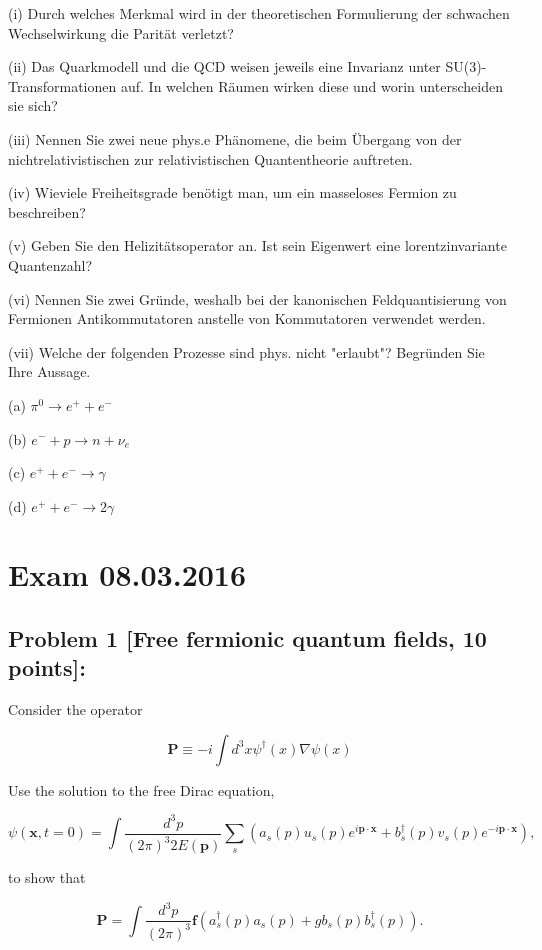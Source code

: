 \documentclass[10pt, letterpaper]{article}
\begin{document}
(i) Durch welches Merkmal wird in der theoretischen Formulierung der schwachen Wechselwirkung die Parität verletzt?

(ii) Das Quarkmodell und die QCD weisen jeweils eine Invarianz unter SU(3)-Transformationen auf. In welchen Räumen wirken diese und worin unterscheiden sie sich?

(iii) Nennen Sie zwei neue phys.e Phänomene, die beim Übergang von der nichtrelativistischen zur relativistischen Quantentheorie auftreten.

(iv) Wieviele Freiheitsgrade benötigt man, um ein masseloses Fermion zu beschreiben?

(v) Geben Sie den Helizitätsoperator an. Ist sein Eigenwert eine lorentzinvariante Quantenzahl?

(vi) Nennen Sie zwei Gründe, weshalb bei der kanonischen Feldquantisierung von Fermionen Antikommutatoren anstelle von Kommutatoren verwendet werden.

(vii) Welche der folgenden Prozesse sind phys. nicht "erlaubt"? Begründen Sie Ihre Aussage.

(a) $\pi^0 \rightarrow e^{+}+e^{-}$

(b) $e^{-}+p \rightarrow n+\nu_e$

(c) $e^{+}+e^{-} \rightarrow \gamma$

(d) $e^{+}+e^{-} \rightarrow 2 \gamma$

\pagebreak

\section{Exam 08.03.2016}

\subsection{Problem 1 [Free fermionic quantum fields, 10 points]:}
Consider the operator

$$
\mathbf{P} \equiv-i \int d^3 x \psi^{\dagger}(x) \nabla \psi(x)
$$


Use the solution to the free Dirac equation,

$$
\psi(\mathbf{x}, t=0)=\int \frac{d^3 p}{(2 \pi)^3 2 E(\mathbf{p})} \sum_s\left(a_s(p) u_s(p) e^{i \mathbf{p} \cdot \mathbf{x}}+b_s^{\dagger}(p) v_s(p) e^{-i \mathbf{p} \cdot \mathbf{x}}\right),
$$

to show that

$$
\mathbf{P}=\int \frac{d^3 p}{(2 \pi)^3} \mathbf{f}\left(a_s^{\dagger}(p) a_s(p)+g b_s(p) b_s^{\dagger}(p)\right) .
$$
\end{document}
